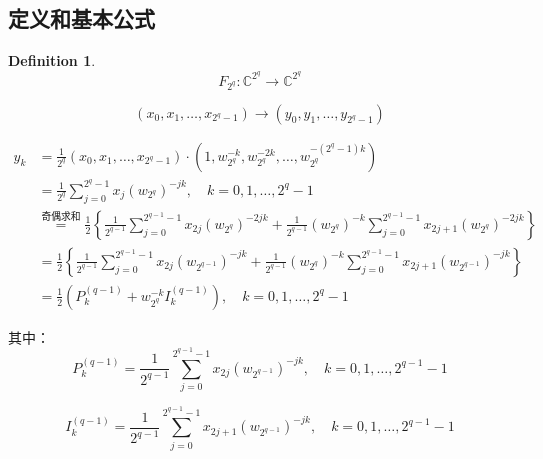 \documentclass[linespread=1.5,openany]{book}%
\theoremstyle{plain}
\newtheorem{definition}{Definition}
\begin{document}
{{{					\subsection{定义和基本公式}
					\begin{definition}
						\begin{equation}
							F_{2^q}: \mathbb{C}^{2^q} \rightarrow \mathbb{C}^{2^q}
						\end{equation}
					\end{definition}
					\begin{equation}
						(x_0, x_1, \ldots, x_{2^q -1}) \rightarrow (y_0, y_1, \ldots, y_{2^q -1})
					\end{equation}
					\begin{center}
						\begin{equation}
							\begin{aligned}
								y_k &= \frac{1}{2^q} (x_0, x_1, \ldots, x_{2^q -1}) \cdot \left(1, w_{2^q}^{-k}, w_{2^q}^{-2k}, \ldots, w_{2^q}^{-(2^q -1)k}\right)\\
								&= \frac{1}{2^q} \sum_{j=0}^{2^q -1} x_j \left(w_{2^q}\right)^{-jk}, \quad k = 0, 1, \ldots, 2^q -1\\
								&\stackrel{\text{奇偶求和}}{=}  \frac{1}{2} \left\{ \frac{1}{2^{q-1}} \sum_{j=0}^{2^{q-1} -1} x_{2j} \left(w_{2^{q }}\right)^{-2jk} + \frac{1}{2^{q-1}}  \left(w_{2^q}\right)^{-k}\sum_{j=0}^{2^{q-1} -1} x_{2j+1} \left(w_{2^{q }}\right)^{-2jk} \right\}\\
								&=\frac{1}{2} \left\{ \frac{1}{2^{q-1}} \sum_{j=0}^{2^{q-1} -1} x_{2j} \left(w_{2^{q-1}}\right)^{-jk} + \frac{1}{2^{q-1}}  \left(w_{2^q}\right)^{-k}\sum_{j=0}^{2^{q-1} -1} x_{2j+1} \left(w_{2^{q-1}}\right)^{-jk} \right\}\\
								&= \frac{1}{2} \left( P_k^{(q-1)} + w_{2^q}^{-k} I_k^{(q-1)} \right), \quad k = 0, 1, \ldots, 2^{q} -1
							\end{aligned}
						\end{equation}
					\end{center}
					其中：
					\begin{equation}
						P_k^{(q-1)} = \frac{1}{2^{q-1}} \sum_{j=0}^{2^{q-1} -1} x_{2j} \left(w_{2^{q-1}}\right)^{-jk}, \quad k = 0, 1, \ldots, 2^{q-1} -1
					\end{equation}
					
					\begin{equation}
						I_k^{(q-1)} = \frac{1}{2^{q-1}} \sum_{j=0}^{2^{q-1} -1} x_{2j+1} \left(w_{2^{q-1}}\right)^{-jk}, \quad k = 0, 1, \ldots, 2^{q-1} -1
					\end{equation}
					
}}}
\end{document}
